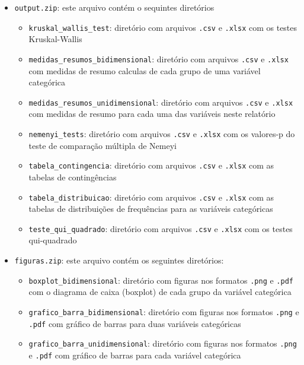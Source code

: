 \documentclass[]{article}
\providecommand{\tightlist}{%
  \setlength{\itemsep}{0pt}\setlength{\parskip}{0pt}}
\begin{document}
\begin{itemize}
\tightlist
\item
  \texttt{output.zip}: este arquivo contém o sequintes diretórios

  \begin{itemize}
  \tightlist
  \item
    \texttt{kruskal\_wallis\_test}: diretório com arquivos \texttt{.csv} e \texttt{.xlsx} com os testes Kruskal-Wallis
  \item
    \texttt{medidas\_resumos\_bidimensional}: diretório com arquivos \texttt{.csv} e \texttt{.xlsx} com medidas de resumo calculas de cada grupo de uma variável categórica
  \item
    \texttt{medidas\_resumos\_unidimensional}: diretório com arquivos \texttt{.csv} e \texttt{.xlsx} com medidas de resumo para cada uma das variáveis neste relatório
  \item
    \texttt{nemenyi\_tests}: diretório com arquivos \texttt{.csv} e \texttt{.xlsx} com os valores-p do teste de comparação múltipla de Nemeyi
  \item
    \texttt{tabela\_contingencia}: diretório com arquivos \texttt{.csv} e \texttt{.xlsx} com as tabelas de contingências
  \item
    \texttt{tabela\_distribuicao}: diretório com arquivos \texttt{.csv} e \texttt{.xlsx} com as tabelas de distribuições de frequências para as variáveis categóricas
  \item
    \texttt{teste\_qui\_quadrado}: diretório com arquivos \texttt{.csv} e \texttt{.xlsx} com os testes qui-quadrado
  \end{itemize}
\item
  \texttt{figuras.zip}: este arquivo contém os seguintes diretórios:

  \begin{itemize}
  \tightlist
  \item
    \texttt{boxplot\_bidimensional}: diretório com figuras nos formatos \texttt{.png} e \texttt{.pdf} com o diagrama de caixa (boxplot) de cada grupo da variável categórica
  \item
    \texttt{grafico\_barra\_bidimensional}: diretório com figuras nos formatos \texttt{.png} e \texttt{.pdf} com gráfico de barras para duas variáveis categóricas
  \item
    \texttt{grafico\_barra\_unidimensional}: diretório com figuras nos formatos \texttt{.png} e \texttt{.pdf} com gráfico de barras para cada variável categórica
  \end{itemize}
\end{itemize}
\end{document}

